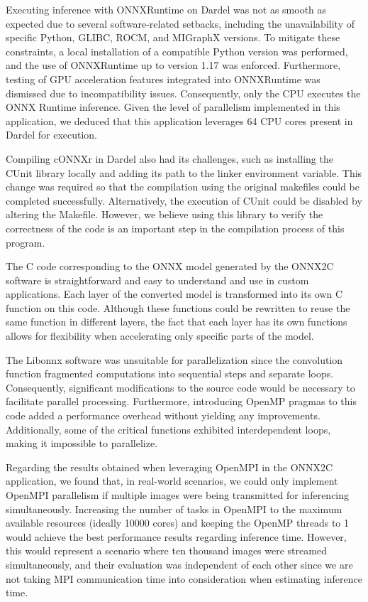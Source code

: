 \documentclass[fleqn,10pt]{olplainarticle}
\begin{document}
Executing inference with ONNXRuntime on Dardel was not as smooth as expected due to several software-related setbacks, including the unavailability of specific Python, GLIBC, ROCM, and MIGraphX versions. To mitigate these constraints, a local installation of a compatible Python version was performed, and the use of ONNXRuntime up to version 1.17 was enforced. Furthermore, testing of GPU acceleration features integrated into ONNXRuntime was dismissed due to incompatibility issues. Consequently, only the CPU executes the ONNX Runtime inference. Given the level of parallelism implemented in this application, we deduced that this application leverages 64 CPU cores present in Dardel for execution.

Compiling cONNXr in Dardel also had its challenges, such as installing the CUnit library locally and adding its path to the linker environment variable. This change was required so that the compilation using the original makefiles could be completed successfully. Alternatively, the execution of CUnit could be disabled by altering the Makefile. However, we believe using this library to verify the correctness of the code is an important step in the compilation process of this program.

The C code corresponding to the ONNX model generated by the ONNX2C software is straightforward and easy to understand and use in custom applications. Each layer of the converted model is transformed into its own C function on this code. Although these functions could be rewritten to reuse the same function in different layers, the fact that each layer has its own functions allows for flexibility when accelerating only specific parts of the model.

The Libonnx software was unsuitable for parallelization since the convolution function fragmented computations into sequential steps and separate loops. Consequently, significant modifications to the source code would be necessary to facilitate parallel processing. Furthermore, introducing OpenMP pragmas to this code added a performance overhead without yielding any improvements. Additionally, some of the critical functions exhibited interdependent loops, making it impossible to parallelize.

Regarding the results obtained when leveraging OpenMPI in the ONNX2C application, we found that, in real-world scenarios, we could only implement OpenMPI parallelism if multiple images were being transmitted for inferencing simultaneously. Increasing the number of tasks in OpenMPI to the maximum available resources (ideally 10000 cores) and keeping the OpenMP threads to 1 would achieve the best performance results regarding inference time. However, this would represent a scenario where ten thousand images were streamed simultaneously, and their evaluation was independent of each other since we are not taking MPI communication time into consideration when estimating inference time.
\end{document}
